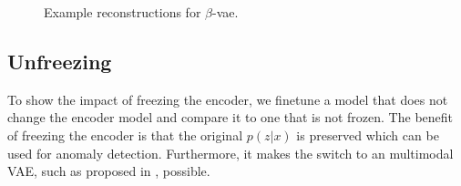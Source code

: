 \begin{figure}[!ht]
    \centering
    \caption{Example reconstructions for $\beta$-vae.}
    \label{fig:beta-vae-recon-examples}
     \quad
\end{figure}



\subsection{Unfreezing}
To show the impact of freezing the encoder, we finetune a model that does not change the encoder model and compare it to one that is not frozen. The benefit of freezing the encoder is that the original $p(z |x)$ is preserved which can be used for anomaly detection. Furthermore, it makes the switch to an multimodal VAE, such as proposed in \cite{vasco2020mhvae}, possible.

